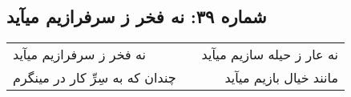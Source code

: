 \begin{center}
\section*{شماره ۳۹: نه فخر ز سرفرازیم میآید}
\label{sec:039}
\begin{longtable}{l p{0.5cm} r}
نه فخر ز سرفرازیم میآید
&&
نه عار ز حیله سازیم میآید
\\
چندان که به سِرِّ کار در مینگرم
&&
مانند خیال بازیم میآید
\\
\end{longtable}
\end{center}
